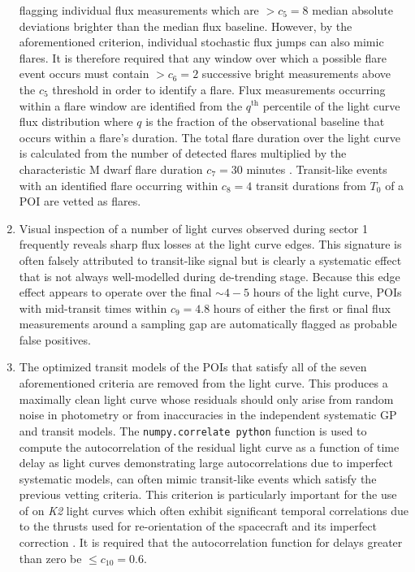 \begin{enumerate}
  flagging individual flux measurements which are $>c_5=8$ median absolute deviations brighter than the
  median flux baseline. However, by the aforementioned criterion, individual stochastic flux jumps can also
  mimic flares. It is therefore required that any window over which a possible flare event occurs must contain
  $>c_6=2$ successive bright measurements above the $c_5$ threshold in order to identify a flare.
  Flux measurements occurring within a flare window are identified from the $q^{\text{th}}$ percentile
  of the light curve flux distribution where $q$ is the fraction of the observational baseline
  that occurs within a flare's duration. The total flare duration over the light curve is calculated from the
  number of detected flares multiplied by the characteristic M dwarf flare duration $c_7=30$ minutes
  \citep{moffett74,walkowicz11,hawley14}. Transit-like
  events with an identified flare occurring within $c_8=4$ transit durations from $T_0$ of a POI are vetted as
  flares.
\item Visual inspection of a number of light curves observed during sector 1 frequently reveals sharp
  flux losses at the light curve edges. This signature is often falsely attributed to transit-like
  signal but is clearly a systematic effect that is not always well-modelled during de-trending stage.
  Because this edge effect appears to operate over the final $\sim 4-5$ hours of the light curve,
  POIs with mid-transit times within $c_9=4.8$ hours of either the first or final flux measurements around
  a sampling gap are automatically flagged as probable false positives.
\item The optimized transit models of the POIs that satisfy all of the seven aforementioned criteria are
  removed from the light curve. This produces a maximally clean light curve whose residuals should only
  arise from random noise in photometry or from inaccuracies in the independent systematic GP and transit
  models. The \texttt{numpy.correlate python} function is used to compute the autocorrelation of the
  residual light curve as a function of time delay as light curves demonstrating large autocorrelations
  due to imperfect systematic models, can often mimic transit-like events which satisfy
  the previous vetting criteria. This criterion is particularly important for the use of \pipeline{} on
  \emph{K2} light curves which often exhibit significant temporal correlations due to the thrusts used for
  re-orientation of the spacecraft and its imperfect correction \citep{vanderburg14}. It is required that
  the autocorrelation function for delays greater than zero be $\leq c_{10}=0.6$.
\end{enumerate}


